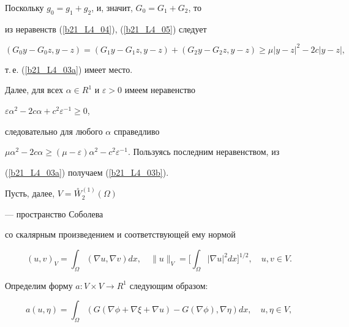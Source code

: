 \begin{pf}
\begin{equation}
\label{b21_L4_05}


\end{equation}


Поскольку $g_0=g_1+g_2$, и, значит, $G_0=G_1+G_2$, то


из неравенств (\ref{b21_L4_04}), (\ref{b21_L4_05}) следует


$$


(G_0 y -G_0 z, y -z)=(G_1 y -G_1 z, y -z)+


(G_2 y -G_2 z, y -z) \geq \mu|y -z|^2 -2c|y -z|,


$$


т.\,е. (\ref{b21_L4_03a}) имеет место.





Далее, для всех $\alpha \in R^1$ и $\varepsilon > 0$ имеем неравенство


$\varepsilon \alpha^2 -2 c \alpha + c^2 \varepsilon^{-1} \geq 0$,


следовательно для любого $\alpha $ справедливо 


$\mu \alpha^2 -2 c \alpha \geq (\mu-\varepsilon)\alpha^2 -c^2


\varepsilon^{-1}$. Пользуясь последним неравенством, из


(\ref{b21_L4_03a}) получаем (\ref{b21_L4_03b}).


\end{pf}








Пусть, далее, $V =\overset{\circ}{W}{}^{(1)}_{2} (\Omega)$


--- пространство Соболева


со скалярным произведением и соответствующей ему нормой


\begin{equation*}


(u, v)_V = \int_{\Omega } (\nabla u, \nabla v) dx, \quad


\|u \|_V =\bigg[\int_{\Omega }|\nabla u|^2 dx\bigg]^{1/2}, \quad


u, v \in V.




\end{equation*}


Определим форму $a:V \times V \rightarrow R^1$ следующим образом:


\begin{equation}


a(u, \eta) = \int_{\Omega }


(G(\nabla \phi + \nabla \xi + \nabla u)-G(\nabla \phi), \nabla \eta)dx,\quad


u, \eta \in V,


\label{d_bz05_1}


\end{equation}


